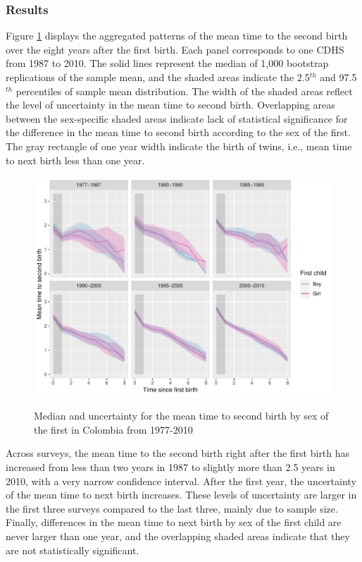 \documentclass[a4paper,left=1.25cm,right=1.25cm,top=1.25cm,bottom=1.25cm]{article}
\begin{document}
\subsubsection{Results}
Figure \ref{fert_01} displays the aggregated patterns of the mean time to the second birth over the eight years after the first birth. Each panel corresponds to one CDHS from 1987 to 2010. The solid lines represent the median of 1,000 bootstrap replications of the sample mean, and the shaded areas indicate the 2.5$^{th}$ and 97.5$^{th}$ percentiles of sample mean distribution. The width of the shaded areas reflect the level of uncertainty in the mean time to second birth. Overlapping areas between the sex-specific shaded areas indicate lack of statistical significance for the difference in the mean time to second birth according to the sex of the first. The gray rectangle of one year width indicate the birth of twins, i.e., mean time to next birth less than one year.
\begin{figure}[H]
\centering
    \includegraphics[width=\textwidth]{Figures/colombia/colombia_period_new_1.pdf}\\
    \caption{Median and uncertainty for the mean time to second birth by sex of the first in Colombia from 1977-2010}
    \label{fert_01}
 \end{figure}

Across surveys, the mean time to the second birth right after the first birth has increased from less than two years in 1987 to slightly more than 2.5 years in 2010, with a very narrow confidence interval. After the first year, the uncertainty of the mean time to next birth increases. These levels of uncertainty are larger in the first three surveys compared to the last three, mainly due to sample size. Finally, differences in the mean time to next birth by sex of the first child are never larger than one year, and the overlapping shaded areas indicate that they are not statistically significant.
\end{document}
